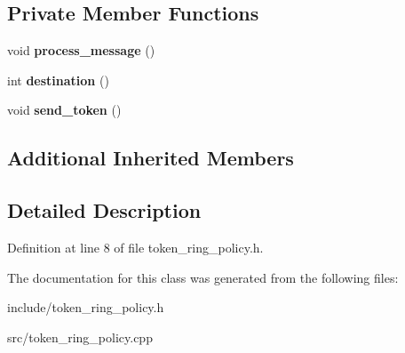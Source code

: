 \subsection*{Private Member Functions}
\begin{DoxyCompactItemize}
\item 
void {\bfseries process\+\_\+message} ()\hypertarget{classdistributed__system_1_1TokenRingMutualExclusionPolicy_aaaa542ed11f0470f15a18b01754e7058}{}\label{classdistributed__system_1_1TokenRingMutualExclusionPolicy_aaaa542ed11f0470f15a18b01754e7058}

\item 
int {\bfseries destination} ()\hypertarget{classdistributed__system_1_1TokenRingMutualExclusionPolicy_a427480a43d844be55be63f111d8805dd}{}\label{classdistributed__system_1_1TokenRingMutualExclusionPolicy_a427480a43d844be55be63f111d8805dd}

\item 
void {\bfseries send\+\_\+token} ()\hypertarget{classdistributed__system_1_1TokenRingMutualExclusionPolicy_af48d2022be2f51f240ef71f4108adbd7}{}\label{classdistributed__system_1_1TokenRingMutualExclusionPolicy_af48d2022be2f51f240ef71f4108adbd7}

\end{DoxyCompactItemize}
\subsection*{Additional Inherited Members}


\subsection{Detailed Description}


Definition at line 8 of file token\+\_\+ring\+\_\+policy.\+h.



The documentation for this class was generated from the following files\+:\begin{DoxyCompactItemize}
\item 
include/token\+\_\+ring\+\_\+policy.\+h\item 
src/token\+\_\+ring\+\_\+policy.\+cpp\end{DoxyCompactItemize}
